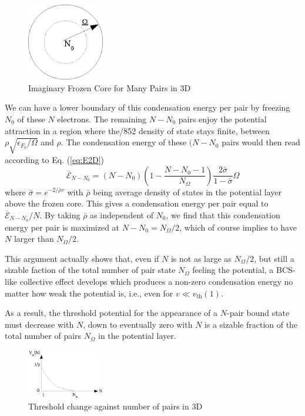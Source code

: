 \documentclass{article}
\begin{document}
\begin{figure}[htbp]
	\centering
		\includegraphics[width=0.30\textwidth]{potential.eps}
	\caption{Imaginary Frozen Core for Many Pairs in 3D}
	\label{fig:potential}
\end{figure}

We can have a lower boundary of this condensation energy per pair by freezing $N_0$ of these $N$ electrons.  The remaining $N-N_0$ pairs enjoy the potential attraction in a region where the/852 density of state stays finite, between $\rho\sqrt{\epsilon_{F_0}/\Omega}$ and $\rho$.  The condensation energy of these $(N-N_0$ pairs would then read according to Eq. (\ref{eq:E2D})
\begin{equation}\label{eq:E2D}
 \overline{\mathcal{E}}_{N-N_0}=(N-N_0)(1-\frac{N-N_0-1}{N_\Omega})\frac{2\bar\sigma}{1-\bar\sigma}\Omega
\end{equation}
where $\bar{\sigma}=e^{-2/{\bar{\rho}v}}$ with $\bar\rho$ being average density of states in the potential layer above the frozen core. This gives a condensation energy per pair equal to $\overline{\mathcal{E}}_{N-N_0}/N$.  By taking $\bar\rho$ as independent of $N_0$, we find that this condensation energy per pair is maximized at $N-N_0=N_\Omega/2$, which of course implies to have $N$ larger than $N_\Omega/2$.

This argument actually shows that, even if $N$ is not as large as $N_\Omega/2$, but still a sizable faction of the total number of pair state $N_\Omega$ feeling the potential,  a BCS-like collective effect develops which produces a non-zero condensation energy no matter how weak the potential is, i.e., even for $v\ll{}v_\text{th}(1)$. 

As a result, the threshold potential for the appearance of a $N$-pair bound state must decrease with $N$, down to eventually zero with $N$ is a sizable fraction of the total number of pairs $N_\Omega$ in the potential layer. 

\begin{figure}[htb]
	\centering
		\includegraphics[width=0.30\textwidth]{3dThresholdChange.eps}
	\caption{Threshold change against number of pairs in 3D}
	\label{fig:3dThresholdChange}
\end{figure}
\end{document}
